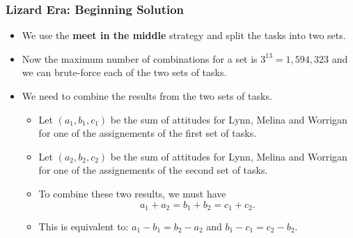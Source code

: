 \documentclass{beamer}
\begin{document}
\begin{frame}[fragile]
\frametitle{Lizard Era: Beginning Solution}

\footnotesize

\begin{itemize}

\item We use the \textbf{meet in the middle} strategy and split the tasks into two sets.

\vspace{0.2cm}

\item<2-> Now the maximum number of combinations for a set is $3^{13} = 1,594,323$
and we can brute-force each of the two sets of tasks.

\vspace{0.2cm}

\item<3-> We need to combine the results from the two sets of tasks.
\begin{itemize}
\footnotesize
\item<3-> Let $(a_1,b_1,c_1)$ be the sum of attitudes
for Lynn, Melina and Worrigan for one of the assignements of the first set of tasks.

\vspace{0.1cm}

\item<3-> Let $(a_2,b_2,c_2)$ be the sum of attitudes
for Lynn, Melina and Worrigan for one of the assignements of the second set of tasks.

\vspace{0.1cm}

\item<4-> To combine these two results, we must have
$$
a_1 + a_2 = b_1 + b_2 = c_1 + c_2.
$$

\item<5-> This is equivalent to: $a_1 - b_1 = b_2 - a_2$ and $b_1 - c_1 = c_2 - b_2$.

\end{itemize}

\end{itemize}

\end{frame}
\end{document}
